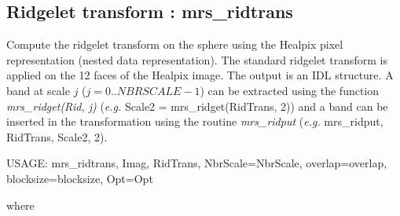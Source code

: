 \subsection{Ridgelet transform : mrs\_ridtrans}
Compute the ridgelet transform on the sphere using the Healpix pixel representation (nested data representation). The standard ridgelet transform 
is applied on the 12 faces of the Healpix image. The output is an IDL structure. A band at scale $j$ ($j=0..NBRSCALE-1$) can be extracted using 
the function {\em mrs\_ridget(Rid, j)} (\emph{e.g.} Scale2 = mrs\_ridget(RidTrans, 2)) and a band can be inserted in the transformation using 
the routine {\em mrs\_ridput} (\emph{e.g.}  mrs\_ridput, RidTrans, Scale2, 2).
{\bf
\begin{center}
     USAGE:  mrs\_ridtrans, Imag, RidTrans, NbrScale=NbrScale, overlap=overlap, blocksize=blocksize, Opt=Opt 
\end{center}}
where
